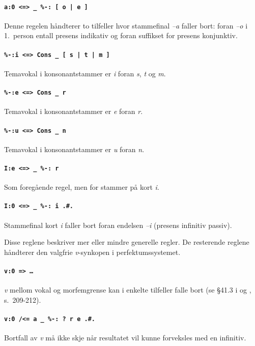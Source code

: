 \documentclass{article}
\newcommand\code[1]{\texttt{#1}}
\newcommand\w[1]{\emph{#1}}
\begin{document}
\paragraph{\code{a:0 <=> \_ \%-: [ o | e ]}} Denne regelen h\aa{}ndterer to
tilfeller hvor stammefinal \w{--a} faller bort: foran \w{--o} i 1.~person
entall presens indikativ og foran suffikset for presens konjunktiv.

\paragraph{\code{\%-:i <=> Cons \_ [ s | t | m ]}} Temavokal i
konsonantstammer er \w{i} foran \w{s}, \w{t} og \w{m}.

\paragraph{\code{\%-:e <=> Cons \_ r}} Temavokal i konsonantstammer er
\w{e} foran \w{r}.

\paragraph{\code{\%-:u <=> Cons \_ n}} Temavokal i konsonantstammer er
\w{u} foran \w{n}.

\paragraph{\code{I:e <=> \_ \%-: r}} Som foreg\aa{}ende regel, men for
stammer p\aa{} kort \w{i}.

\paragraph{\code{I:0 <=> \_ \%-: i .\#.}} Stammefinal kort \w{i} faller bort
foran endelsen \w{--i} (presens infinitiv passiv).

Disse reglene beskriver mer eller mindre generelle regler. De resterende
reglene h\aa{}ndterer den valgfrie \w{v}-synkopen i perfektumssystemet.

\paragraph{\code{v:0 => \ldots}} \w{v} mellom vokal og morfemgrense kan i
enkelte tilfeller falle bort (se \S 41.3 i  og ,
s.~209-212).

\paragraph{\code{v:0 /<= a \_ \%-: ? r e .\#.}} Bortfall av \w{v} m\aa{}
ikke skje n\aa{}r resultatet vil kunne forveksles med en infinitiv.
\end{document}

